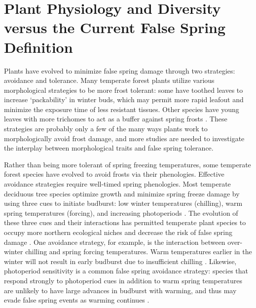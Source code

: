 \documentclass{article}\usepackage[]{graphicx}\usepackage[]{color}
\begin{document}
\section* {Plant Physiology and Diversity versus the Current False Spring Definition}
Plants have evolved to minimize false spring damage through two strategies: avoidance and tolerance. Many temperate forest plants utilize various morphological strategies to be more frost tolerant: some have toothed leaves to increase `packability' in winter buds, which may permit more rapid leafout \citep{Edwards2017} and minimize the exposure time of less resistant tissues. Other species have young leaves with more trichomes to act as a buffer against spring frosts \citep{Prozherina2003, Agrawal2004}. These strategies are probably only a few of the many ways plants work to morphologically avoid frost damage, and more studies are needed to investigate the interplay between morphological traits and false spring tolerance. 

Rather than being more tolerant of spring freezing temperatures, some temperate forest species have evolved to avoid frosts via their phenologies. Effective avoidance strategies require well-timed spring phenologies. Most temperate deciduous tree species optimize growth and minimize spring freeze damage by using three cues to initiate budburst: low winter temperatures (chilling), warm spring temperatures (forcing), and increasing photoperiods \citep{Chuine2010}. The evolution of these three cues and their interactions has permitted temperate plant species to occupy more northern ecological niches \citep{Kollas2014} and decrease the risk of false spring damage %
\citep{Charrier2011}. One avoidance strategy, for example, is the interaction between over-winter chilling and spring forcing temperatures. Warm temperatures earlier in the winter %
will not result in early budburst due to insufficient chilling \citep{Basler2012}. Likewise, photoperiod sensitivity is a common false spring avoidance strategy: species that respond strongly to photoperiod cues in addition to warm spring temperatures are unlikely to have large advances in budburst with warming, and thus may evade false spring events as warming continues \citep{Basler2014}. 
\end{document}
